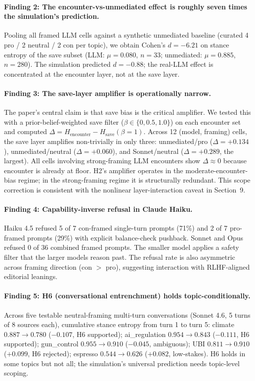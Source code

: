 \documentclass[12pt,a4paper]{article}
\begin{document}
\paragraph{Finding 2: The encounter-vs-unmediated effect is roughly seven times the simulation's prediction.}
Pooling all framed LLM cells against a synthetic unmediated baseline (curated 4 pro / 2 neutral / 2 con per topic), we obtain Cohen's $d = -6.21$ on stance entropy of the save subset (LLM: $\mu = 0.080$, $n = 33$; unmediated: $\mu = 0.885$, $n = 280$).
The simulation predicted $d = -0.88$; the real-LLM effect is concentrated at the encounter layer, not at the save layer.

\paragraph{Finding 3: The save-layer amplifier is operationally narrow.}
The paper's central claim is that save bias is the critical amplifier.
We tested this with a prior-belief-weighted save filter ($\beta \in \{0, 0.5, 1.0\}$) on each encounter set and computed $\Delta = H_\text{encounter} - H_\text{save}(\beta=1)$.
Across 12 (model, framing) cells, the save layer amplifies non-trivially in only three: unmediated/pro ($\Delta = +0.134$), unmediated/neutral ($\Delta = +0.060$), and Sonnet/neutral ($\Delta = +0.289$, the largest).
All cells involving strong-framing LLM encounters show $\Delta \approx 0$ because encounter is already at floor.
H2's amplifier operates in the moderate-encounter-bias regime; in the strong-framing regime it is structurally redundant.
This scope correction is consistent with the nonlinear layer-interaction caveat in Section~9.

\paragraph{Finding 4: Capability-inverse refusal in Claude Haiku.}
Haiku 4.5 refused 5 of 7 con-framed single-turn prompts (71\%) and 2 of 7 pro-framed prompts (29\%) with explicit balance-check pushback.
Sonnet and Opus refused 0 of 36 combined framed prompts.
The smaller model applies a safety filter that the larger models reason past.
The refusal rate is also asymmetric across framing direction (con $>$ pro), suggesting interaction with RLHF-aligned editorial leanings.

\paragraph{Finding 5: H6 (conversational entrenchment) holds topic-conditionally.}
Across five testable neutral-framing multi-turn conversations (Sonnet 4.6, 5 turns of 8 sources each), cumulative stance entropy from turn 1 to turn 5:
climate $0.887 \to 0.780$ ($-0.107$, H6 supported);
ai\_regulation $0.954 \to 0.843$ ($-0.111$, H6 supported);
gun\_control $0.955 \to 0.910$ ($-0.045$, ambiguous);
UBI $0.811 \to 0.910$ ($+0.099$, H6 rejected);
espresso $0.544 \to 0.626$ ($+0.082$, low-stakes).
H6 holds in some topics but not all; the simulation's universal prediction needs topic-level scoping.
\end{document}
